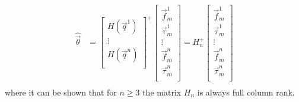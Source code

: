 \begin{equation*}
  \begin{flalign*}
    \hat{\vec{\theta}} &=
    \begin{bmatrix}
      H(\vec{q}^{1})\\
      \vdots \\
      H(\vec{q}^{n})\\
    \end{bmatrix}^{+}
    \begin{bmatrix}
      \vec{f}_{m}^{1} \\
      \vec{\tau}_{m}^{1} \\
      \vdots \\
      \vec{f}_{m}^{n} \\
      \vec{\tau}_{m}^{n} \\
    \end{bmatrix}
    =
    H_n^{+}
    \begin{bmatrix}
      \vec{f}_{m}^{1} \\
      \vec{\tau}_{m}^{1} \\
      \vdots \\
      \vec{f}_{m}^{n} \\
      \vec{\tau}_{m}^{n} \\
    \end{bmatrix}\\
  \end{flalign*}
\end{equation*}
where it can be shown that for $n \ge 3$ the matrix $H_n$ is always full column rank.



